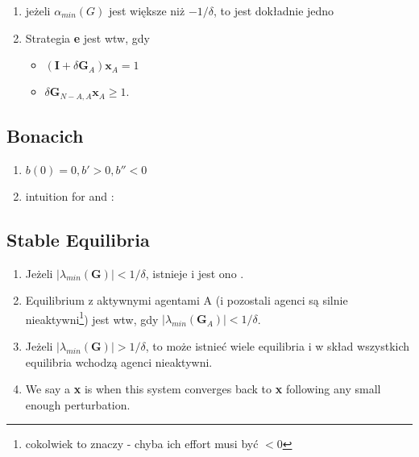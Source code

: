 \documentclass{article}
\newcommand\wassterm[1]{{\color{blue}{#1}}}
\begin{document}
\begin{enumerate}
  \item
    jeżeli $\alpha_{min}(G)$ jest większe niż $-1/\delta$, to jest dokładnie jedno
    \wassterm{Nash equilibrium}
  \item Strategia \textbf{e} jest \wassterm{Nash equilibrium} wtw, gdy 
  	\begin{itemize}
	  \item $ (\textbf{I} + \delta \textbf{G}_{A})\textbf{x}_{A} = 1$
  	  \item $ \delta\textbf{G}_{N-A,A}\textbf{x}_A \geq 1.$
  	\end{itemize}
\end{enumerate}

\subsection{Bonacich}


\begin{enumerate}
  \item
    \wassterm{benefit function}
    $
    b(0) = 0, 
    b' > 0,
    b'' < 0
    $

  \item
    intuition for 
    \wassterm{positive externalities}
    and
    \wassterm{negative externalities}:

\end{enumerate}

\subsection{Stable Equilibria}

\begin{enumerate}
 \item Jeżeli $|\lambda_{min}(\textbf{G})| < 1/\delta$, istnieje \wassterm{unikalne Nash equilibrium} i jest ono \wassterm{stabilne}.
 \item Equilibrium z aktywnymi agentami A (i pozostali agenci są silnie nieaktywni\footnote{cokolwiek to znaczy - chyba ich effort musi być $< 0$}) jest \wassterm{stabilne} wtw, gdy  $|\lambda_{min}(\textbf{G}_{A})| < 1/\delta$.
 \item Jeżeli $|\lambda_{min}(\textbf{G})| > 1/\delta$, to może istnieć wiele equilibria i w skład wszystkich equilibria wchodzą agenci nieaktywni.
 \item We say a \wassterm{Nash equilibrium} \textbf{x} is \wassterm{asymptotically stable} when this system converges back to \textbf{x} following any small enough perturbation.
\end{enumerate}
\end{document}
